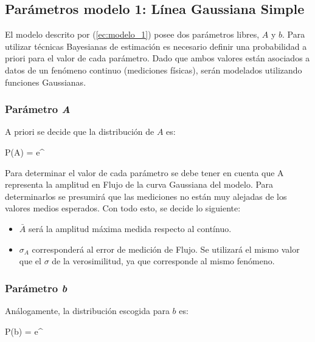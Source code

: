 \documentclass{article}
\begin{document}
\subsection{Parámetros modelo 1: Línea Gaussiana Simple}
\label{sec:modelo1}

El modelo descrito por (\ref{ec:modelo_1}) posee dos parámetros libres, $A$ y $b$. Para utilizar técnicas Bayesianas de estimación es necesario definir una probabilidad a priori para el valor de cada parámetro. Dado que ambos valores están asociados a datos de un fenómeno continuo (mediciones físicas), serán modelados utilizando funciones Gaussianas.

\subsubsection{Parámetro \emph{A}}

A priori se decide que la distribución de $A$ es:

\begin{myequation}
P(A) =  e^{}
\label{ec:distr_A}
\end{myequation}

Para determinar el valor de cada parámetro se debe tener en cuenta que A representa la amplitud en Flujo de la curva Gaussiana del modelo. Para determinarlos se presumirá que las mediciones no están muy alejadas de los valores medios esperados. Con todo esto, se decide lo siguiente:

\begin{itemize}
\item $\bar A$ será la amplitud máxima medida respecto al contínuo.

\item $\sigma_A$ corresponderá al error de medición de Flujo. Se utilizará el mismo valor que el $\sigma$ de la verosimilitud, ya que corresponde al mismo fenómeno.
\end{itemize}

\subsubsection{Parámetro \emph{b}}
Análogamente, la distribución escogida para $b$ es:

\begin{myequation}
P(b) =  e^{}
\end{myequation}
\end{document}
